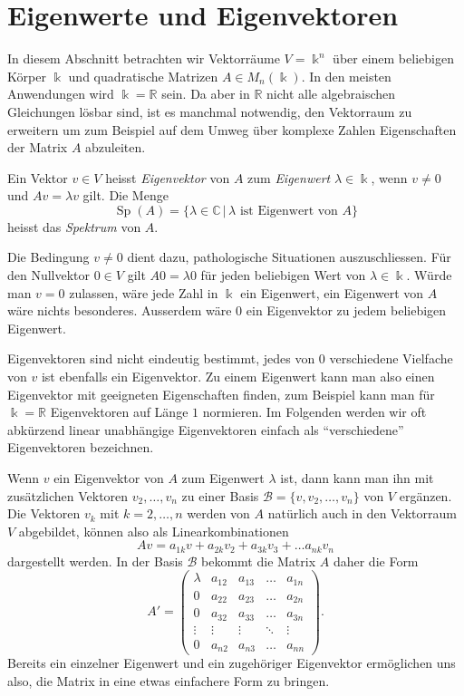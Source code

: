 %
%
%
\section{Eigenwerte und Eigenvektoren
\label{buch:section:eigenwerte-und-eigenvektoren}}
In diesem Abschnitt betrachten wir Vektorräume $V=\Bbbk^n$ über einem
beliebigen Körper $\Bbbk$ und quadratische Matrizen
$A\in M_n(\Bbbk)$.
In den meisten Anwendungen wird $\Bbbk=\mathbb{R}$ sein.
Da aber in $\mathbb{R}$ nicht alle algebraischen Gleichungen lösbar sind,
ist es manchmal notwendig, den Vektorraum zu erweitern um zum Beispiel
auf dem Umweg über komplexe Zahlen
Eigenschaften der Matrix $A$ abzuleiten.

\begin{definition}
\label{buch:eigenwerte:def:evew}
\label{buch:eigenwerte:def:spektrum}
Ein Vektor $v\in V$ heisst {\em Eigenvektor} von $A$ zum {\em Eigenwert}
%
%
$\lambda\in\Bbbk$, wenn $v\ne 0$ und $Av=\lambda v$ gilt.
Die Menge
\[
\operatorname{Sp}(A)
=
\{\lambda\in\mathbb{C}\,|\, \text{$\lambda$ ist Eigenwert von $A$}\}
\]
heisst das {\em Spektrum} von $A$.
%
\end{definition}

Die Bedingung $v\ne 0$ dient dazu, pathologische Situationen auszuschliessen.
Für den Nullvektor $0\in V$ gilt $A0=\lambda 0$ für jeden beliebigen Wert von
$\lambda\in\Bbbk$.
Würde man $v=0$ zulassen, wäre jede Zahl in $\Bbbk$ ein Eigenwert,
ein Eigenwert von $A$ wäre nichts besonderes.
Ausserdem wäre $0$ ein Eigenvektor zu jedem beliebigen Eigenwert.

Eigenvektoren sind nicht eindeutig bestimmt, jedes von $0$ verschiedene
Vielfache von $v$ ist ebenfalls ein Eigenvektor.
Zu einem Eigenwert kann man also einen Eigenvektor mit 
geeigneten Eigenschaften finden, zum Beispiel kann man für $\Bbbk = \mathbb{R}$
Eigenvektoren auf Länge $1$ normieren.
Im Folgenden werden wir oft abkürzend linear unabhängige Eigenvektoren
einfach als ``verschiedene'' Eigenvektoren bezeichnen.

Wenn $v$ ein Eigenvektor von $A$ zum Eigenwert $\lambda$ ist, dann kann
man ihn mit zusätzlichen Vektoren $v_2,\dots,v_n$ zu einer Basis
$\mathcal{B}=\{v,v_2,\dots,v_n\}$
von $V$ ergänzen.
Die Vektoren $v_k$ mit $k=2,\dots,n$ werden von $A$ natürlich auch
in den Vektorraum $V$ abgebildet, können also als Linearkombinationen
\[
Av = a_{1k}v + a_{2k}v_2 + a_{3k}v_3 + \dots a_{nk}v_n
\]
dargestellt werden.
In der Basis $\mathcal{B}$ bekommt die Matrix $A$ daher die Form
\[
A'
=
\begin{pmatrix}
\lambda&a_{12}&a_{13}&\dots &a_{1n}\\
    0  &a_{22}&a_{23}&\dots &a_{2n}\\
    0  &a_{32}&a_{33}&\dots &a_{3n}\\
\vdots &\vdots&\vdots&\ddots&\vdots\\
    0  &a_{n2}&a_{n3}&\dots &a_{nn}
\end{pmatrix}.
\]
Bereits ein einzelner Eigenwert und ein zugehöriger Eigenvektor
ermöglichen uns also, die Matrix in eine etwas einfachere Form
zu bringen.

